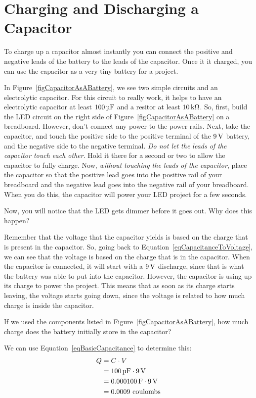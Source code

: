 \section{Charging and Discharging a Capacitor}

To charge up a capacitor almost instantly you can connect the positive and negative leads of the battery to the leads of the capacitor.
Once it it charged, you can use the capacitor as a very tiny battery for a project.


In Figure~\ref{figCapacitorAsABattery}, we see two simple circuits and an electrolytic capacitor.
For this circuit to really work, it helps to have an electrolytic capacitor at least $100\,\si{\micro\farad}$ and a resitor at least $10\,\si{\kilo\ohm}$.
So, first, build the LED circuit on the right side of Figure~\ref{figCapacitorAsABattery} on a breadboard.
However, don't connect any power to the power rails.
Next, take the capacitor, and touch the positive side to the positive terminal of the $9\,\si{\volt}$ battery, and the negative side to the negative terminal.
\emph{Do not let the leads of the capacitor touch each other}.
Hold it there for a second or two to allow the capacitor to fully charge.
Now, \emph{without touching the leads of the capacitor}, place the capacitor so that the positive lead goes into the positive rail of your breadboard and the negative lead goes into the negative rail of your breadboard.
When you do this, the capacitor will power your LED project for a few seconds.

Now, you will notice that the LED gets dimmer before it goes out.  
Why does this happen?

Remember that the voltage that the capacitor yields is based on the charge that is present in the capacitor.
So, going back to Equation~\ref{eqCapacitanceToVoltage}, we can see that the voltage is based on the charge that is in the capacitor.
When the capacitor is connected, it will start with a $9\,\si{\volt}$ discharge, since that is what the battery was able to put into the capacitor.
However, the capacitor is using up its charge to power the project.
This means that as soon as its charge starts leaving, the voltage starts going down, since the voltage is related to how much charge is inside the capacitor.

\begin{exampleprob}
If we used the components listed in Figure~\ref{figCapacitorAsABattery}, how much charge does the battery initially store in the capacitor?

We can use Equation~\ref{eqBasicCapacitance} to determine this:
\begin{align*}
Q &= C\cdot V \\
  &= 100\,\si{\micro\farad}\cdot 9\,\si{\volt} \\
  &= 0.000100\,\si{\farad}\cdot 9\,\si{\volt} \\
  &= 0.0009 \textrm{ coulombs}
\end{align*}
\end{exampleprob}

